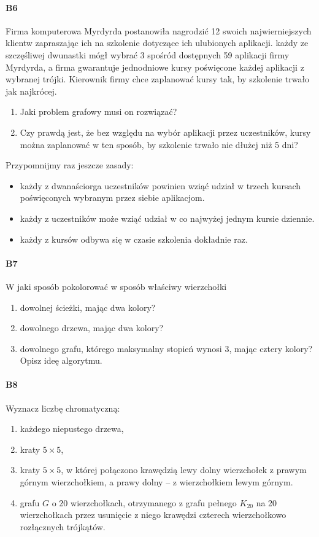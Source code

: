 \documentclass[a4paper,12pt]{article}
\theoremstyle{definition}%
\theoremstyle{definition}
\theoremstyle{problem}
\begin{document}
\paragraph{B6} Firma komputerowa Myrdyrda postanowiła nagrodzić 12 swoich najwierniejszych klientw zapraszając
ich na szkolenie dotyczące ich ulubionych aplikacji. każdy ze szczęśliwej dwunastki mógł wybrać 3 spośród dostępnych 59 aplikacji firmy Myrdyrda, a firma gwarantuje jednodniowe kursy poświęcone każdej aplikacji
z wybranej trójki. Kierownik firmy chce zaplanować kursy tak, by szkolenie trwało jak najkrócej.
\begin{enumerate}[label=\alph*)]
\item Jaki problem grafowy musi on rozwiązać?
\item Czy prawdą jest, że bez względu na wybór aplikacji przez uczestników, kursy można zaplanować w ten sposób, by szkolenie trwało nie dłużej niż 5 dni?
\end{enumerate}
Przypomnijmy raz jeszcze zasady:
\begin{itemize}
\item każdy z dwanaściorga uczestników powinien wziąć udział w trzech kursach poświęconych wybranym przez siebie aplikacjom.
\item każdy z uczestników może wziąć udział w co najwyżej jednym kursie dziennie.
\item każdy z kursów odbywa się w czasie szkolenia dokładnie raz.
\end{itemize}

\paragraph{B7} W jaki sposób pokolorować w sposób właściwy wierzchołki
\begin{enumerate}[label=\alph*)]
\item dowolnej ścieżki, mając dwa kolory?
\item dowolnego drzewa, mając dwa kolory?
\item dowolnego grafu, którego maksymalny stopień wynosi 3, mając cztery kolory?
Opisz ideę algorytmu.
\end{enumerate}

\paragraph{B8} Wyznacz liczbę chromatyczną:
\begin{enumerate}[label=\alph*)]
\item każdego niepustego drzewa,
\item kraty $5 \times 5$,
\item  kraty $5 \times 5$, w której połączono krawędzią lewy dolny wierzchołek z prawym górnym wierzchołkiem, a prawy dolny – z wierzchołkiem lewym górnym.
\item  grafu $G$ o 20 wierzchołkach, otrzymanego z grafu pełnego $K_{20}$ na 20 wierzchołkach przez usunięcie z
niego krawędzi czterech wierzchołkowo rozłącznych trójkątów.
\end{enumerate}
\end{document}
